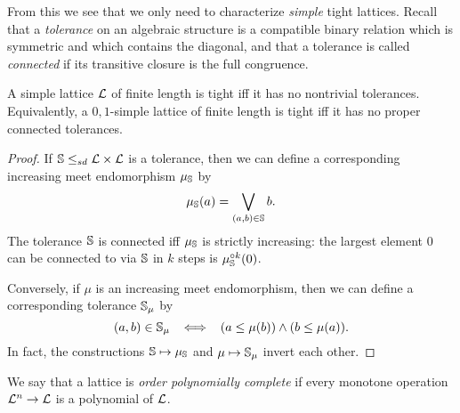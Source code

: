 \begin{appendices}
From this we see that we only need to characterize \emph{simple} tight lattices. Recall that a \emph{tolerance} on an algebraic structure is a compatible binary relation which is symmetric and which contains the diagonal, and that a tolerance is called \emph{connected} if its transitive closure is the full congruence.

\begin{prop} A simple lattice $\mathcal{L}$ of finite length is tight iff it has no nontrivial tolerances. Equivalently, a $0,1$-simple lattice of finite length is tight iff it has no proper connected tolerances.
\end{prop}
\begin{proof} If $\mathbb{S} \le_{sd} \mathcal{L} \times \mathcal{L}$ is a tolerance, then we can define a corresponding increasing meet endomorphism $\mu_{\mathbb{S}}$ by
\[
\mu_{\mathbb{S}}(a) = \bigvee_{(a,b) \in \mathbb{S}} b.
\]
The tolerance $\mathbb{S}$ is connected iff $\mu_{\mathbb{S}}$ is strictly increasing: the largest element $0$ can be connected to via $\mathbb{S}$ in $k$ steps is $\mu_{\mathbb{S}}^{\circ k}(0)$.

Conversely, if $\mu$ is an increasing meet endomorphism, then we can define a corresponding tolerance $\mathbb{S}_\mu$ by
\[
(a,b) \in \mathbb{S}_\mu \;\; \iff \;\; (a \le \mu(b)) \wedge (b \le \mu(a)).
\]
In fact, the constructions $\mathbb{S} \mapsto \mu_{\mathbb{S}}$ and $\mu \mapsto \mathbb{S}_\mu$ invert each other.
\end{proof}

We say that a lattice is \emph{order polynomially complete} if every monotone operation $\mathcal{L}^n \rightarrow \mathcal{L}$ is a polynomial of $\mathcal{L}$.


\end{appendices}
